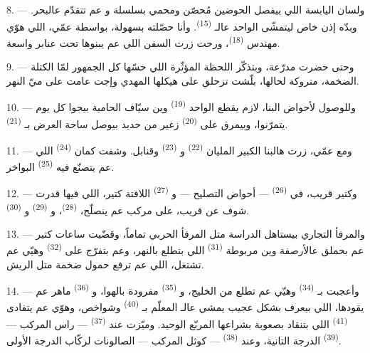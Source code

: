 8. --- ولسان اليابسة اللي بيفصل الحوضين مُحصّن ومحمي بسلسلة
 و عم تتقدّم عالبحر. وبدّه إذن خاص
ليتمشّى الواحد عالـ \textsuperscript{(15)}. وأنا حصّلته
بسهولة، بواسطة عمّي، اللي هوّي مهندس 
\textsuperscript{(18)}، ورحت زرت السفن اللي عم يبنوها تحت عنابر واسعة.

9. --- وحتى حضرت  مدرّعة، وبتذكّر اللحظة المؤثّرة اللي
حسّها كل الجمهور لمّا الكتلة الضخمة، متروكة لحالها، بلّشت تزحلق على
هيكلها المهدي وإجت عامت على ميّ النهر.

10. --- وللوصول لأحواض البنا، لازم يقطع الواحد 
\textsuperscript{(19)} وين سيّاف الحامية بيجوا كل يوم يتمرّنوا، وبيمرق
على  \textsuperscript{(20)} زغير من حديد بيوصل ساحة العرض
بـ \textsuperscript{(21)}.

\VUsaut{3.0mm}
\VUsaut{3.0mm}

11. --- ومع عمّي، زرت هالبنا الكبير المليان 
\textsuperscript{(22)} و \textsuperscript{(23)} وقنابل. وشفت
كمان  \textsuperscript{(24)} اللي عم يتصنّع فيه
 \textsuperscript{(25)} البواخر.

12. --- وكتير قريب، في  \textsuperscript{(26)} —
أحواض التصليح — و \textsuperscript{(27)} اللافتة
كتير، اللي فيها قدرت شوف عن قريب، على مركب عم ينصلّح،
 \textsuperscript{(28)}، و
\textsuperscript{(29)} و \textsuperscript{(30)}.

13. --- والمرفأ التجاري بيستاهل الدراسة متل المرفأ الحربي تماماً،
وقضّيت ساعات كتير عم بحملق عالأرصفة وين مربوطة 
\textsuperscript{(31)} اللي بتطلع بالنهر، وعم بتفرّج على  \textsuperscript{(32)} وهيّي عم تشتغل، اللي عم ترفع حمول ضخمة متل
الريش.

\VUsaut{4.0mm}
\VUsaut{3.0mm}

14. --- وأعجبت بـ \textsuperscript{(34)} وهيّي
عم تطلع من الخليج، و \textsuperscript{(35)} مفرودة
بالهوا، و \textsuperscript{(36)} ماهر عم يقودها، اللي بيعرف
بشكل عجيب يمشي عالـ المعلّم بـ
\textsuperscript{(40)} وشواخص، وهوّي عم يتفادى  \textsuperscript{(41)} اللي بتنقاد بصعوبة بشراعها المربّع
الوحيد. وميّزت عند  \textsuperscript{(37)} --- راس المركب
---  \textsuperscript{(39)} الدرجة التانية، وعند
 \textsuperscript{(38)} --- كوثل المركب --- الصالونات
لركّاب الدرجة الأولى.

